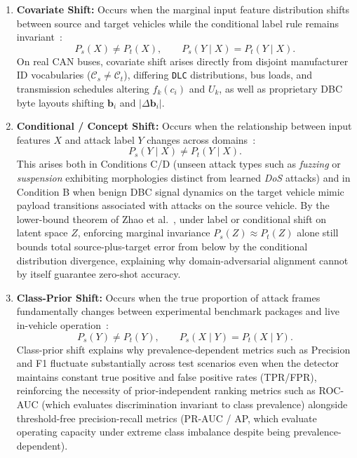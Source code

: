 \documentclass[12pt, a4paper, reqno, oneside]{book}
\DeclareRobustCommand{\code}[1]{\nolinkurl{#1}}
\begin{document}
\begin{enumerate}
    \item \textbf{Covariate Shift:} Occurs when the marginal input feature distribution shifts between source and target vehicles while the conditional label rule remains invariant~\cite{shimodaira2000covariate,quinonerocandela2009dataset,morenotorres2012shift}:
    \begin{equation}\label{eq:covariate-shift}
    P_s(X) \neq P_t(X), \qquad P_s(Y \mid X) = P_t(Y \mid X).
    \end{equation}
    On real CAN buses, covariate shift arises directly from disjoint manufacturer ID vocabularies ($\mathcal{C}_s \neq \mathcal{C}_t$), differing \code{DLC} distributions, bus loads, and transmission schedules altering $f_k(c_i)$ and $U_k$, as well as proprietary DBC byte layouts shifting $\mathbf{b}_i$ and $|\Delta \mathbf{b}_i|$.
    \item \textbf{Conditional / Concept Shift:} Occurs when the relationship between input features $X$ and attack label $Y$ changes across domains~\cite{morenotorres2012shift,zhao2019invariant}:
    \begin{equation}\label{eq:conditional-shift}
    P_s(Y \mid X) \neq P_t(Y \mid X).
    \end{equation}
    This arises both in Conditions C/D (unseen attack types such as \textit{fuzzing} or \textit{suspension} exhibiting morphologies distinct from learned \textit{DoS} attacks) and in Condition B when benign DBC signal dynamics on the target vehicle mimic payload transitions associated with attacks on the source vehicle. By the lower-bound theorem of Zhao et al.~\cite{zhao2019invariant}, under label or conditional shift on latent space $Z$, enforcing marginal invariance $P_s(Z) \approx P_t(Z)$ alone still bounds total source-plus-target error from below by the conditional distribution divergence, explaining why domain-adversarial alignment cannot by itself guarantee zero-shot accuracy.
    \item \textbf{Class-Prior Shift:} Occurs when the true proportion of attack frames fundamentally changes between experimental benchmark packages and live in-vehicle operation~\cite{morenotorres2012shift}:
    \begin{equation}\label{eq:prior-shift}
    P_s(Y) \neq P_t(Y), \qquad P_s(X \mid Y) = P_t(X \mid Y).
    \end{equation}
    Class-prior shift explains why prevalence-dependent metrics such as Precision and F1 fluctuate substantially across test scenarios even when the detector maintains constant true positive and false positive rates (TPR/FPR), reinforcing the necessity of prior-independent ranking metrics such as ROC-AUC (which evaluates discrimination invariant to class prevalence) alongside threshold-free precision-recall metrics (PR-AUC / AP, which evaluate operating capacity under extreme class imbalance despite being prevalence-dependent).

\end{enumerate}
\end{document}
